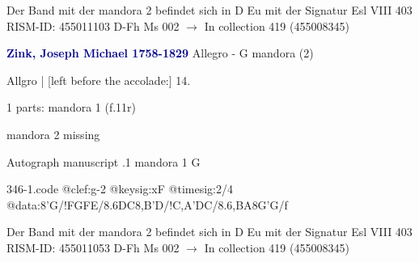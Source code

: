 \documentclass[twocolumn]{book}
\begin{document}
\newline Der Band mit der mandora 2 befindet sich in D Eu mit der Signatur Esl VIII 403
\newline RISM-ID: 455011103
\newline D-Fh  Ms 002
\newline $\rightarrow$ In collection 419 (455008345)
      
\newline \par \vspace{7pt} \textcolor{darkblue}{\textbf{Zink, Joseph Michael  1758-1829}}
\newline Allegro - G
\newline mandora (2)
\newline \begin{itshape}[f.11r, at left:] Allgro | [left before the accolade:] 14.\end{itshape} 
\newline \textcolor{darkblue}{}  1 parts: mandora 1  (f.11r)
\newline \begin{small} mandora 2 missing\end{small} 
\newline Autograph manuscript
.1  mandora 1  G  
\begin{filecontents*}{346-1.code}
@clef:g-2
@keysig:xF
@timesig:2/4
@data:8'G/!FGFE/{8.6DC}8,B'D/!{C,A}'DC/{8.6,BA}8G'G/f
\end{filecontents*}
\newline
%

\newline Der Band mit der mandora 2 befindet sich in D Eu mit der Signatur Esl VIII 403
\newline RISM-ID: 455011053
\newline D-Fh  Ms 002
\newline $\rightarrow$ In collection 419 (455008345)
      
\end{document}

